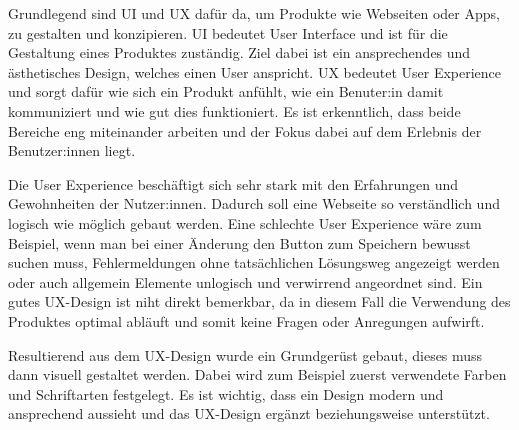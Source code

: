 Grundlegend sind UI und UX dafür da, um Produkte wie Webseiten oder Apps, zu gestalten und konzipieren. UI bedeutet User Interface und ist für die Gestaltung eines Produktes zuständig. Ziel dabei ist ein ansprechendes und ästhetisches Design, welches einen User anspricht. UX bedeutet User Experience und sorgt dafür wie sich ein Produkt anfühlt, wie ein Benuter:in damit kommuniziert und wie gut dies funktioniert. Es ist erkenntlich, dass beide Bereiche eng miteinander arbeiten und der Fokus dabei auf dem Erlebnis der Benutzer:innen liegt.

Die User Experience beschäftigt sich sehr stark mit den Erfahrungen und Gewohnheiten der Nutzer:innen. Dadurch soll eine Webseite so verständlich und logisch wie möglich gebaut werden. Eine schlechte User Experience wäre zum Beispiel, wenn man bei einer Änderung den Button zum Speichern bewusst suchen muss, Fehlermeldungen ohne tatsächlichen Lösungsweg angezeigt werden oder auch allgemein Elemente unlogisch und verwirrend angeordnet sind. Ein gutes UX-Design ist niht direkt bemerkbar, da in diesem Fall die Verwendung des Produktes optimal abläuft und somit keine Fragen oder Anregungen aufwirft.

Resultierend aus dem UX-Design wurde ein Grundgerüst gebaut, dieses muss dann visuell gestaltet werden. Dabei wird zum Beispiel zuerst verwendete Farben und Schriftarten festgelegt. Es ist wichtig, dass ein Design modern und ansprechend aussieht und das UX-Design ergänzt beziehungsweise unterstützt.
